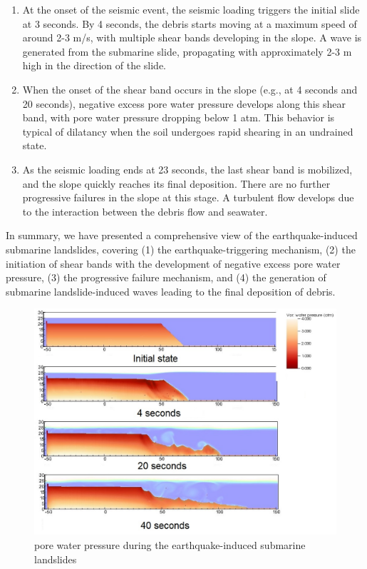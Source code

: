 \documentclass[preprint,12pt]{elsarticle}
\begin{document}
\begin{enumerate}
\item At the onset of the seismic event, the seismic loading triggers the initial slide at 3 seconds. By 4 seconds, the debris starts moving at a maximum speed of around 2-3 m/s, with multiple shear bands developing in the slope. A wave is generated from the submarine slide, propagating with approximately 2-3 m high in the direction of the slide.
\item When the onset of the shear band occurs in the slope (e.g., at 4 seconds and 20 seconds), negative excess pore water pressure develops along this shear band, with pore water pressure dropping below 1 atm. This behavior is typical of dilatancy when the soil undergoes rapid shearing in an undrained state.
\item  As the seismic loading ends at 23 seconds, the last shear band is mobilized, and the slope quickly reaches its final deposition. There are no further progressive failures in the slope at this stage. A turbulent flow develops due to the interaction between the debris flow and seawater.
\end {enumerate}
%
In summary, we have presented a comprehensive view of the earthquake-induced submarine landslides, covering (1) the earthquake-triggering mechanism, (2) the initiation of shear bands with the development of negative excess pore water pressure, (3) the progressive failure mechanism, and (4) the generation of submarine landslide-induced waves leading to the final deposition of debris.
%
\begin{figure}[H]
\center
\includegraphics[scale=0.5]{PWP.jpeg}
\caption{pore water pressure during the earthquake-induced submarine landslides}
\label{fig:PWP}
\end {figure}
\end{document}
